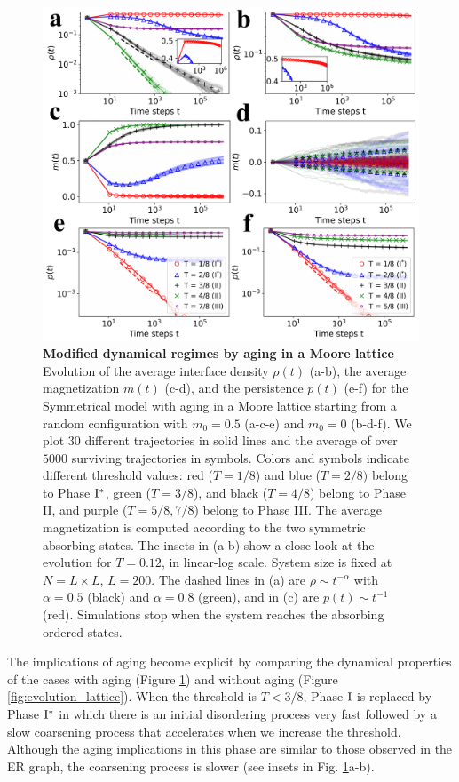 	\begin{figure}
		 \centering
		 \includegraphics[width=\linewidth]{Figs/Aging_STM/FIG12.pdf}
		 \caption{\label{fig:evolution_lattice_aging} \textbf{Modified dynamical regimes by aging in a Moore lattice} Evolution of the average interface density $\rho(t)$ (a-b), the average magnetization $m(t)$ (c-d), and the persistence $p(t)$ (e-f) for the Symmetrical model with aging in a Moore lattice starting from a random configuration with $m_0 = 0.5$ (a-c-e) and $m_0 = 0$ (b-d-f). We plot 30 different trajectories in solid lines and the average of over $5000$ surviving trajectories in symbols. Colors and symbols indicate different threshold values: red ($T = 1/8$) and blue ($T = 2/8)$ belong to Phase ${\rm I}^{*}$, green ($T = 3/8$), and black ($T=4/8$) belong to Phase II, and purple ($T = 5/8, 7/8$) belong to Phase III. The average magnetization is computed according to the two symmetric absorbing states. The insets in (a-b) show a close look at the evolution for $T = 0.12$, in linear-log scale. System size is fixed at $N = L \times L$, $L = 200$. The dashed lines in (a) are $\rho \sim t^{-\alpha}$ with $\alpha = 0.5$ (black) and $\alpha = 0.8$ (green), and in (c) are $p(t) \sim t^{-1}$ (red). 
		 Simulations stop when the system reaches the absorbing ordered states.}
	\end{figure}
	
	The implications of aging become explicit by comparing the dynamical properties of the cases with aging (Figure \ref{fig:evolution_lattice_aging}) and without aging (Figure \ref{fig:evolution_lattice}). When the threshold is $T<3/8$, Phase ${\rm I}$ is replaced by Phase ${\rm I}^{*}$ in which there is an initial disordering process very fast followed by a slow coarsening process that accelerates when we increase the threshold. Although the aging implications in this phase are similar to those observed in the ER graph, the coarsening process is slower  (see insets in Fig. \ref{fig:evolution_lattice_aging}a-b).
	
